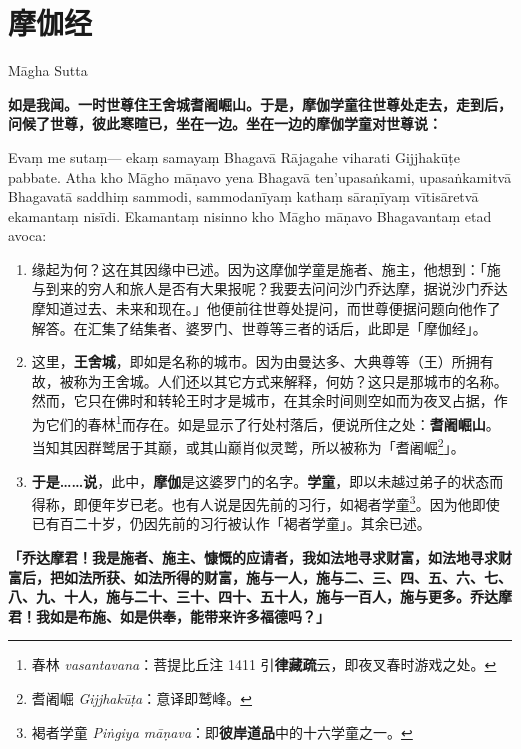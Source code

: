 \section{摩伽经}

\begin{center}Māgha Sutta\end{center}\vspace{1em}

\textbf{如是我闻。一时世尊住王舍城耆阇崛山。于是，摩伽学童往世尊处走去，走到后，问候了世尊，彼此寒暄已，坐在一边。坐在一边的摩伽学童对世尊说：}

Evaṃ me sutaṃ— ekaṃ samayaṃ Bhagavā Rājagahe viharati Gijjhakūṭe pabbate. Atha kho Māgho māṇavo yena Bhagavā ten’upasaṅkami, upasaṅkamitvā Bhagavatā saddhiṃ sammodi, sammodanīyaṃ kathaṃ sāraṇīyaṃ vītisāretvā ekamantaṃ nisīdi. Ekamantaṃ nisinno kho Māgho māṇavo Bhagavantaṃ etad avoca:

\begin{enumerate}\item 缘起为何？这在其因缘中已述。因为这摩伽学童是施者、施主，他想到：「施与到来的穷人和旅人是否有大果报呢？我要去问问沙门乔达摩，据说沙门乔达摩知道过去、未来和现在。」他便前往世尊处提问，而世尊便据问题向他作了解答。在汇集了结集者、婆罗门、世尊等三者的话后，此即是「摩伽经」。
\item 这里，\textbf{王舍城}，即如是名称的城市。因为由曼达多、大典尊等（王）所拥有故，被称为王舍城。人们还以其它方式来解释，何妨？这只是那城市的名称。然而，它只在佛时和转轮王时才是城市，在其余时间则空如而为夜叉占据，作为它们的春林\footnote{春林 \textit{vasantavana}：菩提比丘注 1411 引\textbf{律藏疏}云，即夜叉春时游戏之处。}而存在。如是显示了行处村落后，便说所住之处：\textbf{耆阇崛山}。当知其因群鹫居于其巅，或其山巅肖似灵鹫，所以被称为「耆阇崛\footnote{耆阇崛 \textit{Gijjhakūṭa}：意译即鹫峰。}」。
\item \textbf{于是……说}，此中，\textbf{摩伽}是这婆罗门的名字。\textbf{学童}，即以未越过弟子的状态而得称，即便年岁已老。也有人说是因先前的习行，如褐者学童\footnote{褐者学童 \textit{Piṅgiya māṇava}：即\textbf{彼岸道品}中的十六学童之一。}。因为他即使已有百二十岁，仍因先前的习行被认作「褐者学童」。其余已述。\end{enumerate}

\textbf{「乔达摩君！我是施者、施主、慷慨的应请者，我如法地寻求财富，如法地寻求财富后，把如法所获、如法所得的财富，施与一人，施与二、三、四、五、六、七、八、九、十人，施与二十、三十、四十、五十人，施与一百人，施与更多。乔达摩君！我如是布施、如是供奉，能带来许多福德吗？」}

